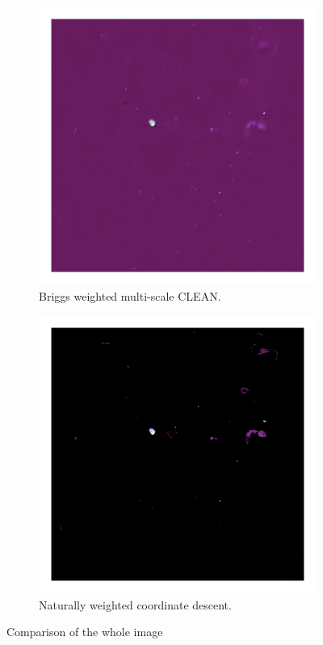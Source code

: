 \begin{figure}[h]
	\centering
	\begin{subfigure}[b]{0.4\linewidth}
		\includegraphics[width=1.00\linewidth, clip, trim={0.72in 0.72in 0.72in 0.72in}]{./chapters/10.results/MSClean/Briggs-CLEAN.png}
		\caption{Briggs weighted multi-scale CLEAN.}
		\label{results:comp:clean}
	\end{subfigure}
	\begin{subfigure}[b]{0.40\linewidth}
		\includegraphics[width=1.00\linewidth, clip, trim={0.72in 0.72in 0.72in 0.72in}]{./chapters/10.results/SerialCD/CD-reference.png}
		\caption{Naturally weighted coordinate descent.}
		\label{results:comp:cd}
	\end{subfigure}
	\caption{Comparison of the whole image}
	\label{results:cleancomp:figure}
\end{figure}

